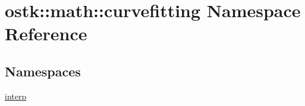 \hypertarget{namespaceostk_1_1math_1_1curvefitting}{}\section{ostk\+:\+:math\+:\+:curvefitting Namespace Reference}
\label{namespaceostk_1_1math_1_1curvefitting}
\subsection*{Namespaces}
\begin{DoxyCompactItemize}
\item 
 \hyperlink{namespaceostk_1_1math_1_1curvefitting_1_1interp}{interp}
\end{DoxyCompactItemize}
